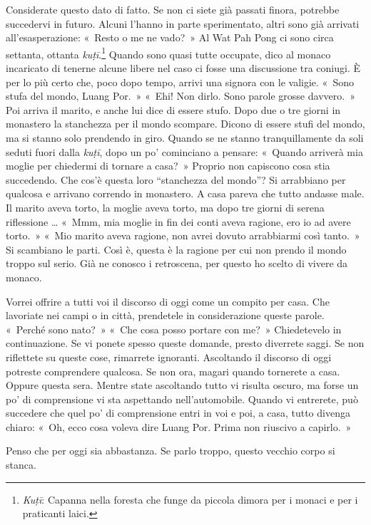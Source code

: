 Considerate questo dato di fatto. Se non ci siete già passati finora,
potrebbe succedervi in futuro. Alcuni l'hanno in parte sperimentato,
altri sono già arrivati all'esasperazione: «~Resto o me ne vado?~» Al
Wat Pah Pong ci sono circa settanta, ottanta \emph{kuṭī}.\footnote{\emph{Kuṭī}:
  Capanna nella foresta che funge da piccola dimora per i monaci e per i
  praticanti laici.} Quando sono quasi tutte occupate, dico al monaco
incaricato di tenerne alcune libere nel caso ci fosse una discussione
tra coniugi. È per lo più certo che, poco dopo tempo, arrivi una signora
con le valigie. «~Sono stufa del mondo, Luang Por.~» «~Ehi! Non dirlo.
Sono parole grosse davvero.~» Poi arriva il marito, e anche lui dice di
essere stufo. Dopo due o tre giorni in monastero la stanchezza per il
mondo scompare. Dicono di essere stufi del mondo, ma si stanno solo
prendendo in giro. Quando se ne stanno tranquillamente da soli seduti
fuori dalla \emph{kuṭī}, dopo un po' cominciano a pensare: «~Quando
arriverà mia moglie per chiedermi di tornare a casa?~» Proprio non
capiscono cosa stia succedendo. Che cos'è questa loro ``stanchezza del
mondo''? Si arrabbiano per qualcosa e arrivano correndo in monastero. A
casa pareva che tutto andasse male. Il marito aveva torto, la moglie
aveva torto, ma dopo tre giorni di serena riflessione \ldots{} «~Mmm, mia
moglie in fin dei conti aveva ragione, ero io ad avere torto.~» «~Mio
marito aveva ragione, non avrei dovuto arrabbiarmi così tanto.~» Si
scambiano le parti. Così è, questa è la ragione per cui non prendo il
mondo troppo sul serio. Già ne conosco i retroscena, per questo ho
scelto di vivere da monaco.

Vorrei offrire a tutti voi il discorso di oggi come un compito per casa.
Che lavoriate nei campi o in città, prendetele in considerazione queste
parole. «~Perché sono nato?~» «~Che cosa posso portare con me?~»
Chiedetevelo in continuazione. Se vi ponete spesso queste domande,
presto diverrete saggi. Se non riflettete su queste cose, rimarrete
ignoranti. Ascoltando il discorso di oggi potreste comprendere qualcosa.
Se non ora, magari quando tornerete a casa. Oppure questa sera. Mentre
state ascoltando tutto vi risulta oscuro, ma forse un po' di
comprensione vi sta aspettando nell'automobile. Quando vi entrerete, può
succedere che quel po' di comprensione entri in voi e poi, a casa, tutto
divenga chiaro: «~Oh, ecco cosa voleva dire Luang Por. Prima non
riuscivo a capirlo.~»

Penso che per oggi sia abbastanza. Se parlo troppo, questo vecchio corpo
si stanca.

